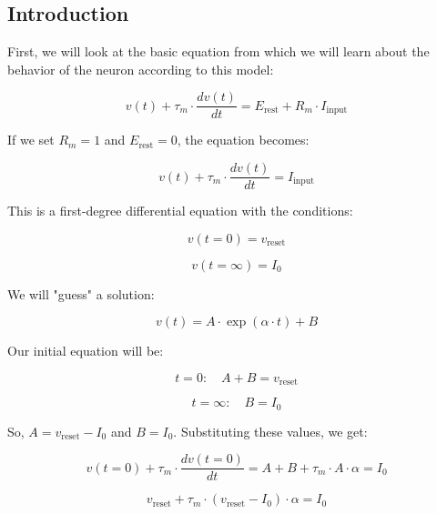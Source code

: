 \subsection{Introduction}

First, we will look at the basic equation from which we will learn about the behavior of the neuron according to this model:

\begin{equation}
v(t) + \tau_m \cdot \frac{dv(t)}{dt} = E_{\text{rest}} + R_m \cdot I_{\text{input}}
\end{equation}

If we set \( R_m = 1 \) and \( E_{\text{rest}} = 0 \), the equation becomes:

\begin{equation}
v(t) + \tau_m \cdot \frac{dv(t)}{dt} = I_{\text{input}}
\end{equation}

This is a first-degree differential equation with the conditions:

\begin{equation}
v(t=0) = v_{\text{reset}}
\end{equation}

\begin{equation}
v(t=\infty) = I_0
\end{equation}

We will "guess" a solution: 

\begin{equation}
v(t) = A \cdot \exp(\alpha \cdot t) + B
\end{equation}

Our initial equation will be:

\begin{equation}
t=0 : \quad A + B = v_{\text{reset}}
\end{equation}

\begin{equation}
t=\infty : \quad B = I_0
\end{equation}

So, \( A = v_{\text{reset}} - I_0 \) and \( B = I_0 \). Substituting these values, we get:

\begin{equation}
v(t=0) + \tau_m \cdot \frac{dv(t=0)}{dt} = A + B + \tau_m \cdot A \cdot \alpha = I_0
\end{equation}

\begin{equation}
v_{\text{reset}} + \tau_m \cdot (v_{\text{reset}} - I_0) \cdot \alpha = I_0
\end{equation}

